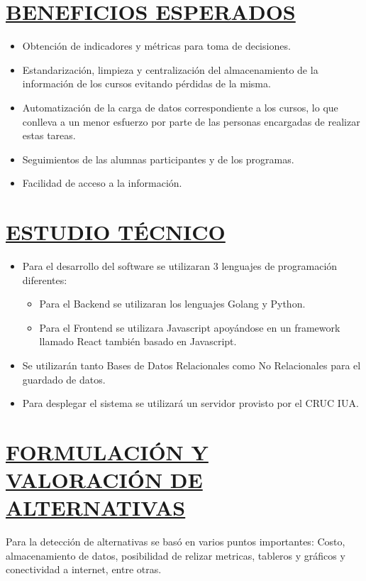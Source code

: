 \section*{\underline{BENEFICIOS ESPERADOS}}
\begin{itemize}
	\item Obtención de indicadores y métricas para toma de decisiones.
	\item Estandarización, limpieza y centralización del almacenamiento de la información de los cursos evitando pérdidas de la misma.
	\item Automatización de la carga de datos correspondiente a los cursos, lo que conlleva a un menor esfuerzo por parte de las personas encargadas de realizar estas tareas.
	\item Seguimientos de las alumnas participantes y de los programas.
	\item Facilidad de acceso a la información.
\end{itemize}


\section*{\underline{ESTUDIO TÉCNICO}}
\begin{itemize}
	\item Para el desarrollo del software se utilizaran 3 lenguajes de programación diferentes:
	\begin{itemize}
		\item Para el Backend se utilizaran los lenguajes Golang y Python.
		\item Para el Frontend se utilizara Javascript apoyándose en un framework llamado React también basado en Javascript.
	\end{itemize}
	\item Se utilizarán tanto Bases de Datos Relacionales como No Relacionales para el guardado de datos.
	\item Para desplegar el sistema se utilizará un servidor provisto por el CRUC IUA.\\
\end{itemize}



\section*{\underline{FORMULACIÓN Y VALORACIÓN DE ALTERNATIVAS}}
Para la detección de alternativas se basó en varios puntos importantes: Costo, almacenamiento de datos, posibilidad de relizar metricas, tableros y gráficos y conectividad a internet, entre otras.\\

